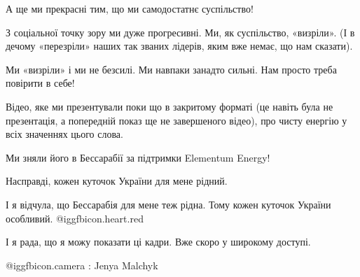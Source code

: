 А ще ми прекрасні тим, що ми самодостатнє суспільство!

З соціальної точку зору ми дуже прогресивні. Ми, як суспільство, «визріли». (І
в дечому «перезріли» наших так званих лідерів, яким вже немає, що нам сказати).

Ми «визріли» і ми не безсилі. Ми навпаки занадто сильні. Нам просто треба
повірити в себе!

Відео, яке ми презентували поки що в закритому форматі (це навіть була не
презентація, а попередній показ ще не завершеного відео), про чисту енергію у
всіх значеннях цього слова. 

Ми зняли його в Бессарабії за підтримки Elementum Energy!

Насправді, кожен куточок України для мене рідний. 

І я відчула, що Бессарабія для мене  теж рідна. Тому кожен куточок України
особливий. @igg{fbicon.heart.red}

І я рада, що я можу показати ці кадри. Вже скоро у широкому доступі.

@igg{fbicon.camera} : Jenya Malchyk
